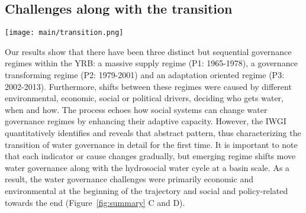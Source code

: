 \subsection{Challenges along with the transition}

\begin{figure*}[htbp!]
	\centering
	\texttt{[image: main/transition.png]}
	\caption{
		Transition schema in hydrosocial cycle and water governance regimes. The natural water cycle dominates blue pathways while socio-economic feedback dominate red pathways.
		\textbf{A. Early phase.} As socio-economic systems developing, non-provisioning water demand increases; simultaneously, increased adaptive capacity by engineering allows people to manage water resources for alleviating the water stress.
		\textbf{B. Late phase} With further human interventions, trade-offs between provisioning-purpose and non-provisioning water use become prominent; basin-wide socio-economic system requires to more organized water governance.
		Thus, \textbf{C. the hydrosocial water cycle transition} correlates with the water governance regime shifts (in the YRB, they are identified as massive supply regime, transformation governance regime, and adaptation oriented regime). The transformation governance regime shift occurs following water deficit, with rapid growth of adaptive capacity.
		\textbf{D. Water governance challenges} Through the transitional regimes, water governance faces primarily economic and environmental challenges in the early phase and social and policy challenges in the late phase.
	}
	\label{fig:summary}
\end{figure*}

Our results show that there have been three distinct but sequential governance regimes within the YRB: a massive supply regime (P1: 1965-1978), a governance transforming regime (P2: 1979-2001) and an adaptation oriented regime (P3: 2002-2013).
Furthermore, shifts between these regimes were caused by different environmental, economic, social or political drivers, deciding who gets water, when and how.
The process echoes how social systems can change water governance regimes by enhancing their adaptive capacity. %
However, the IWGI quantitatively identifies and reveals that abstract pattern, thus characterizing the transition of water governance in detail for the first time.
It is important to note that each indicator or cause changes gradually, but emerging regime shifts move water governance along with the hydrosocial water cycle at a basin scale.
As a result, the water governance challenges were primarily economic and environmental at the beginning of the trajectory and social and policy-related towards the end (Figure~\ref{fig:summary} C and D).

